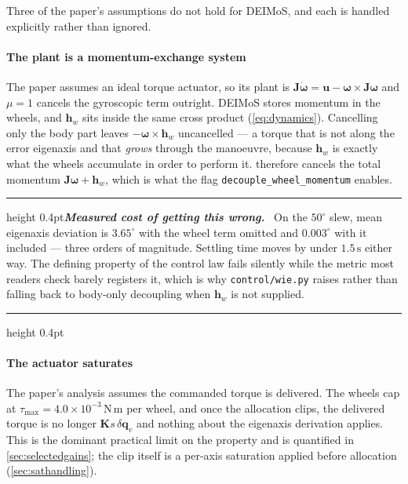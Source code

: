\documentclass[conference,10pt,a4paper]{IEEEtran}
\newcommand{\remarkrule}{\par\nobreak\vspace{2pt}%
  \hrule height 0.4pt\vspace{4pt}\nobreak}
\newenvironment{keybox}[1][Result]
  {\par\medskip\remarkrule\noindent\small\textbf{\textit{#1.}}\ \ignorespaces}
  {\par\vspace{3pt}\hrule height 0.4pt\par\medskip\ignorespacesafterend}
\newcommand{\vect}[1]{\bm{#1}}
\newcommand{\mat}[1]{\bm{#1}}
\newcommand{\unit}[1]{\ensuremath{\,\mathrm{#1}}}
\begin{document}
Three of the paper's assumptions do not hold for DEIMoS, and each is handled
explicitly rather than ignored.

\paragraph{The plant is a momentum-exchange system}
The paper assumes an ideal torque actuator, so its plant is
$\mat{J}\dot{\vect{\omega}}=\vect{u}-\vect{\omega}\times\mat{J}\vect{\omega}$
and $\mu=1$ cancels the gyroscopic term outright. DEIMoS stores momentum in the
wheels, and $\vect{h}_w$ sits inside the same cross product
(\cref{eq:dynamics}). Cancelling only the body part leaves
$-\vect{\omega}\times\vect{h}_w$ uncancelled --- a torque that is not along the
error eigenaxis and that \emph{grows} through the manoeuvre, because
$\vect{h}_w$ is exactly what the wheels accumulate in order to perform it.
 therefore cancels the total momentum $\mat{J}\vect{\omega}+\vect{h}_w$,
which is what the flag \texttt{decouple\_wheel\_momentum} enables.

\begin{keybox}[Measured cost of getting this wrong]
On the $50^\circ$ slew, mean eigenaxis deviation is $3.65^\circ$ with the wheel
term omitted and $0.003^\circ$ with it included --- three orders of magnitude.
Settling time moves by under $1.5\unit{s}$ either way. The defining property of
the control law fails silently while the metric most readers check barely
registers it, which is why \texttt{control/wie.py} raises rather than falling
back to body-only decoupling when $\vect{h}_w$ is not supplied.
\end{keybox}

\paragraph{The actuator saturates}
The paper's analysis assumes the commanded torque is delivered. The wheels cap
at $\tau_\text{max}=4.0\times10^{-3}\unit{N\,m}$ per wheel, and once the
allocation clips, the delivered torque is no longer $\mat{K}s\,\delta\vect{q}_v$
and nothing about the eigenaxis derivation applies. This is the dominant
practical limit on the property and is quantified in \cref{sec:selectedgains};
the clip itself is a per-axis saturation applied before allocation
(\cref{sec:sathandling}).
\end{document}
